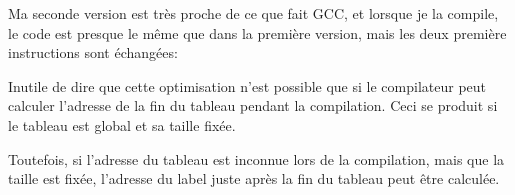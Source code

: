 Ma seconde version est très proche de ce que fait GCC, et lorsque je la compile,
le code est presque le même que dans la première version, mais les deux première
instructions sont échangées:



Inutile de dire que cette optimisation n'est possible que si le compilateur peut
calculer l'adresse de la fin du tableau pendant la compilation.
Ceci se produit si le tableau est global et sa taille fixée.

Toutefois, si l'adresse du tableau est inconnue lors de la compilation, mais que la
taille est fixée, l'adresse du label juste après la fin du tableau peut être calculée.

